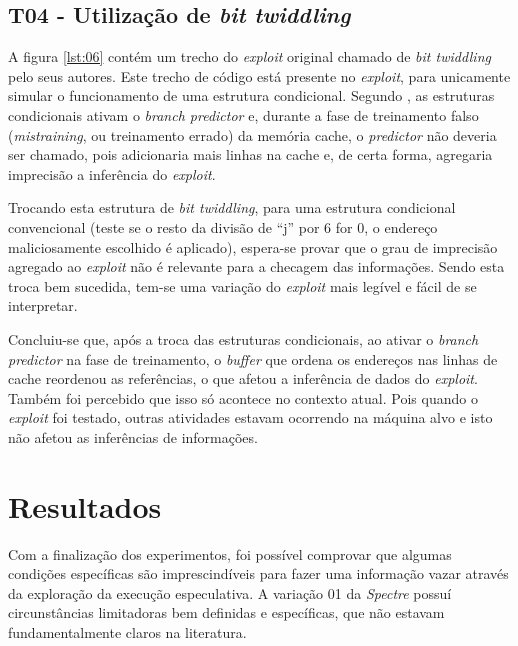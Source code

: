 \documentclass[conference]{IEEEtran}
\begin{document}
\subsection{T04 - Utilização de \emph{bit twiddling}}
A figura \ref{lst:06} contém um trecho do \emph{exploit} original chamado de \emph{bit twiddling} pelo seus autores. Este trecho de código está presente no \emph{exploit}, para unicamente simular o funcionamento de uma estrutura condicional. Segundo , as estruturas condicionais ativam o \emph{branch predictor} e, durante a fase de treinamento falso (\emph{mistraining}, ou treinamento errado) da memória cache, o \emph{predictor} não deveria ser chamado, pois adicionaria mais linhas na cache e, de certa forma, agregaria imprecisão a inferência do \emph{exploit}.



Trocando esta estrutura de \emph{bit twiddling}, para uma estrutura condicional convencional (teste se o resto da divisão de ``j'' por 6 for 0, o endereço maliciosamente escolhido é aplicado), espera-se provar que o grau de imprecisão agregado ao \emph{exploit} não é relevante para a checagem das informações. Sendo esta troca bem sucedida, tem-se uma variação do \emph{exploit} mais legível e fácil de se interpretar.

Concluiu-se que, após a troca das estruturas condicionais, ao ativar o \emph{branch predictor} na fase de treinamento, o \emph{buffer} que ordena os endereços nas linhas de cache reordenou as referências, o que afetou a inferência de dados do \emph{exploit}. Também foi percebido que isso só acontece no contexto atual. Pois quando o \emph{exploit} foi testado, outras atividades estavam ocorrendo na máquina alvo e isto não afetou as inferências de informações.

\section{Resultados}
Com a finalização dos experimentos, foi possível comprovar que algumas condições específicas são imprescindíveis para fazer uma informação vazar através da exploração da execução especulativa. A variação 01 da \emph{Spectre} possuí circunstâncias limitadoras bem definidas e específicas, que não estavam fundamentalmente claros na literatura.
\end{document}
